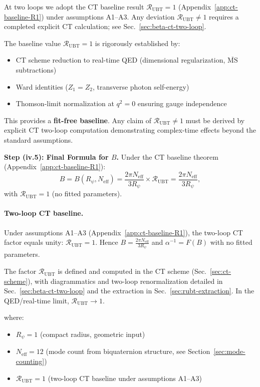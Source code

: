 \documentclass[11pt,a4paper]{article}
\theoremstyle{remark}
\begin{document}
At two loops we adopt the CT baseline result $\mathcal{R}_{\mathrm{UBT}} = 1$ (Appendix~\ref{app:ct-baseline-R1}) under assumptions A1--A3. Any deviation $\mathcal{R}_{\mathrm{UBT}} \neq 1$ requires a completed explicit CT calculation; see Sec.~\ref{sec:beta-ct-two-loop}.

The baseline value $\mathcal{R}_{\mathrm{UBT}} = 1$ is rigorously established by:
\begin{itemize}
\item CT scheme reduction to real-time QED (dimensional regularization, $\overline{\mathrm{MS}}$ subtractions)
\item Ward identities ($Z_1=Z_2$, transverse photon self-energy)
\item Thomson-limit normalization at $q^2=0$ ensuring gauge independence
\end{itemize}

This provides a \textbf{fit-free baseline}. Any claim of $\mathcal{R}_{\mathrm{UBT}} \neq 1$ must be derived by explicit CT two-loop computation demonstrating complex-time effects beyond the standard assumptions.

\textbf{Step (iv.5): Final Formula for $B$.} Under the CT baseline theorem (Appendix~\ref{app:ct-baseline-R1}):
\begin{equation}
\boxed{
B = B(R_\psi, N_{\text{eff}}) = \frac{2\pi N_{\text{eff}}}{3 R_\psi} \times \mathcal{R}_{\text{UBT}} = \frac{2\pi N_{\text{eff}}}{3 R_\psi},
}
\label{eq:B-final-boxed}
\end{equation}
with $\mathcal{R}_{\text{UBT}} = 1$ (no fitted parameters).

\paragraph{Two-loop CT baseline.}
Under assumptions A1--A3 (Appendix~\ref{app:ct-baseline-R1}), the two-loop CT factor equals unity: $\mathcal{R}_{\mathrm{UBT}}=1$. Hence $B=\frac{2\pi N_{\mathrm{eff}}}{3R_\psi}$ and $\alpha^{-1}=F(B)$ with no fitted parameters.

The factor \(\mathcal R_{\mathrm{UBT}}\) is defined and computed in the CT scheme
(Sec.~\ref{sec:ct-scheme}), with diagrammatics and two-loop renormalization detailed in
Sec.~\ref{sec:beta-ct-two-loop} and the extraction in Sec.~\ref{sec:rubt-extraction}.
In the QED/real-time limit, \(\mathcal R_{\mathrm{UBT}}\to 1\).

\noindent where:
\begin{itemize}
\item $R_\psi = 1$ (compact radius, geometric input)
\item $N_{\text{eff}} = 12$ (mode count from biquaternion structure, see Section~\ref{sec:mode-counting})
\item $\mathcal{R}_{\text{UBT}} = 1$ (two-loop CT baseline under assumptions A1--A3)
\end{itemize}
\end{document}
